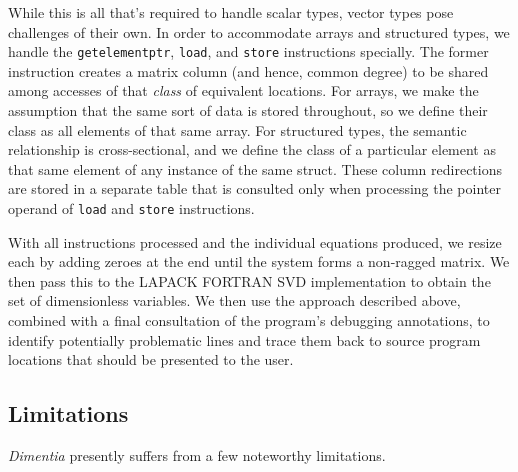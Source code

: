 \documentclass[12pt]{article}
\begin{document}
While this is all that's required to handle scalar types, vector types pose challenges of their own.
In order to accommodate arrays and structured types, we handle the \texttt{getelementptr}, \texttt{load}, and \texttt{store} instructions specially.
The former instruction creates a matrix column (and hence, common degree) to be shared among accesses of that \textit{class} of equivalent locations.
For arrays, we make the assumption that the same sort of data is stored throughout, so we define their class as all elements of that same array.
For structured types, the semantic relationship is cross-sectional, and we define the class of a particular element as that same element of any instance of the same struct.
These column redirections are stored in a separate table that is consulted only when processing the pointer operand of \texttt{load} and \texttt{store} instructions.

With all instructions processed and the individual equations produced, we resize each by adding zeroes at the end until the system forms a non-ragged matrix.
We then pass this to the LAPACK FORTRAN SVD implementation to obtain the set of dimensionless variables.
We then use the approach described above, combined with a final consultation of the program's debugging annotations, to identify potentially problematic lines and trace them back to source program locations that should be presented to the user.

\subsection{Limitations}

\textit{Dimentia} presently suffers from a few noteworthy limitations.
\end{document}
